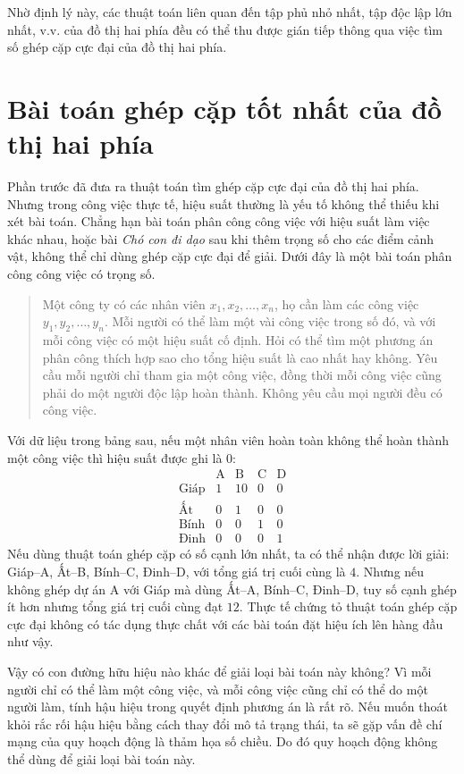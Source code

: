 \documentclass[11pt]{article}
\begin{document}
Nhờ định lý này, các thuật toán liên quan đến tập phủ nhỏ nhất, tập độc lập
lớn nhất, v.v. của đồ thị hai phía đều có thể thu được gián tiếp thông qua
việc tìm số ghép cặp cực đại của đồ thị hai phía.

\section{Bài toán ghép cặp tốt nhất của đồ thị hai phía}

Phần trước đã đưa ra thuật toán tìm ghép cặp cực đại của đồ thị hai phía.
Nhưng trong công việc thực tế, hiệu suất thường là yếu tố không thể thiếu
khi xét bài toán. Chẳng hạn bài toán phân công công việc với hiệu suất làm
việc khác nhau, hoặc bài \textit{Chó con đi dạo} sau khi thêm trọng số cho
các điểm cảnh vật, không thể chỉ dùng ghép cặp cực đại để giải. Dưới đây là
một bài toán phân công công việc có trọng số.

\begin{quote}
Một công ty có các nhân viên \(x_1,x_2,\ldots,x_n\), họ cần làm các công
việc \(y_1,y_2,\ldots,y_n\). Mỗi người có thể làm một vài công việc trong số
đó, và với mỗi công việc có một hiệu suất cố định. Hỏi có thể tìm một phương
án phân công thích hợp sao cho tổng hiệu suất là cao nhất hay không. Yêu cầu
mỗi người chỉ tham gia một công việc, đồng thời mỗi công việc cũng phải do
một người độc lập hoàn thành. Không yêu cầu mọi người đều có công việc.
\end{quote}

Với dữ liệu trong bảng sau, nếu một nhân viên hoàn toàn không thể hoàn thành
một công việc thì hiệu suất được ghi là \(0\):
\[
\begin{array}{c|cccc}
 & \text{A} & \text{B} & \text{C} & \text{D}\\ \hline
\text{Giáp} & 1 & 10 & 0 & 0\\
\text{Ất} & 0 & 1 & 0 & 0\\
\text{Bính} & 0 & 0 & 1 & 0\\
\text{Đinh} & 0 & 0 & 0 & 1
\end{array}
\]
Nếu dùng thuật toán ghép cặp có số cạnh lớn nhất, ta có thể nhận được lời
giải: Giáp--A, Ất--B, Bính--C, Đinh--D, với tổng giá trị cuối cùng là \(4\).
Nhưng nếu không ghép dự án A với Giáp mà dùng Ất--A, Bính--C, Đinh--D, tuy
số cạnh ghép ít hơn nhưng tổng giá trị cuối cùng đạt \(12\). Thực tế chứng
tỏ thuật toán ghép cặp cực đại không có tác dụng thực chất với các bài toán
đặt hiệu ích lên hàng đầu như vậy.

Vậy có con đường hữu hiệu nào khác để giải loại bài toán này không? Vì mỗi
người chỉ có thể làm một công việc, và mỗi công việc cũng chỉ có thể do một
người làm, tính hậu hiệu trong quyết định phương án là rất rõ. Nếu muốn thoát
khỏi rắc rối hậu hiệu bằng cách thay đổi mô tả trạng thái, ta sẽ gặp vấn đề
chí mạng của quy hoạch động là thảm họa số chiều. Do đó quy hoạch động không
thể dùng để giải loại bài toán này.
\end{document}
